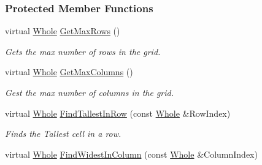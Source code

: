 \subsubsection*{Protected Member Functions}
\begin{DoxyCompactItemize}
\item 
\hypertarget{classphys_1_1UI_1_1CellGrid_ab031e5d26dcb8b2617533e284816b5ed}{
virtual \hyperlink{namespacephys_a460f6bc24c8dd347b05e0366ae34f34a}{Whole} \hyperlink{classphys_1_1UI_1_1CellGrid_ab031e5d26dcb8b2617533e284816b5ed}{GetMaxRows} ()}
\label{d8/d59/classphys_1_1UI_1_1CellGrid_ab031e5d26dcb8b2617533e284816b5ed}

\begin{DoxyCompactList}\small\item\em Gets the max number of rows in the grid. \item\end{DoxyCompactList}\item 
\hypertarget{classphys_1_1UI_1_1CellGrid_ac7338fc2ba7cc9575c9f47d70d998574}{
virtual \hyperlink{namespacephys_a460f6bc24c8dd347b05e0366ae34f34a}{Whole} \hyperlink{classphys_1_1UI_1_1CellGrid_ac7338fc2ba7cc9575c9f47d70d998574}{GetMaxColumns} ()}
\label{d8/d59/classphys_1_1UI_1_1CellGrid_ac7338fc2ba7cc9575c9f47d70d998574}

\begin{DoxyCompactList}\small\item\em Gest the max number of columns in the grid. \item\end{DoxyCompactList}\item 
\hypertarget{classphys_1_1UI_1_1CellGrid_ae2970e94e9f4e79520ff93bb0c3238b0}{
virtual \hyperlink{namespacephys_a460f6bc24c8dd347b05e0366ae34f34a}{Whole} \hyperlink{classphys_1_1UI_1_1CellGrid_ae2970e94e9f4e79520ff93bb0c3238b0}{FindTallestInRow} (const \hyperlink{namespacephys_a460f6bc24c8dd347b05e0366ae34f34a}{Whole} \&RowIndex)}
\label{d8/d59/classphys_1_1UI_1_1CellGrid_ae2970e94e9f4e79520ff93bb0c3238b0}

\begin{DoxyCompactList}\small\item\em Finds the Tallest cell in a row. \item\end{DoxyCompactList}\item 
\hypertarget{classphys_1_1UI_1_1CellGrid_af659299b53bb143d6593c6ac84ef45a3}{
virtual \hyperlink{namespacephys_a460f6bc24c8dd347b05e0366ae34f34a}{Whole} \hyperlink{classphys_1_1UI_1_1CellGrid_af659299b53bb143d6593c6ac84ef45a3}{FindWidestInColumn} (const \hyperlink{namespacephys_a460f6bc24c8dd347b05e0366ae34f34a}{Whole} \&ColumnIndex)}
\label{d8/d59/classphys_1_1UI_1_1CellGrid_af659299b53bb143d6593c6ac84ef45a3}


\end{DoxyCompactItemize}
